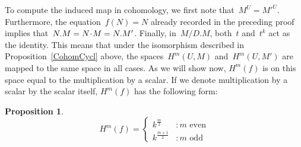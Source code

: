 \documentclass[12pt]{article}
\theoremstyle{definition}
\newtheorem{Proposition}[Satz]{Proposition}
\theoremstyle{break}
\renewcommand{\1}{\mathbbm{1}}
\newcommand{\scdot}{\mathbin{\mspace{-3mu} \cdot \mspace{-3mu}}}
\begin{document}
To compute the induced map in cohomology, we first note that~$M^U = M'^U$. Furthermore, the equation~$f(N) = N$ already recorded in the preceding proof implies that~\mbox{$N.M = N \scdot M= N.M'$}. Finally, in~$M/D.M$, both~$t$ and~$t^k$ act as the identity. This means that under the isomorphism described in Proposition~\ref{CohomCycl} above, the spaces~$H^m(U,M)$ and~$H^m(U,M')$ are mapped to the same space in all cases. As we will show now, $H^m(f)$ is on this space equal to the multiplication by a scalar. If we denote multiplication by a scalar by the scalar itself, $H^m(f)$ has the following form:
\begin{Proposition} \label{Hmf}
\[H^m(f) =
\begin{cases}
k^{\tfrac{m}{2}} &: m \text{ even}\\
k^{\tfrac{m+1}{2}}  &: m \text{ odd}
\end{cases}\]
\end{Proposition}
\end{document}
